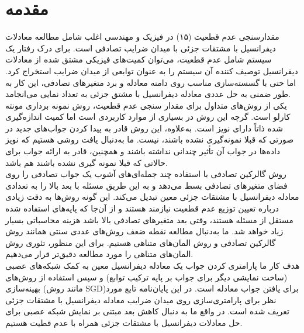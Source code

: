 \section*{مقدمه}
مقدارسنجی عدم قطعیت (۱۵) در فیزیک و مهندسی اغلب شامل مطالعه معادلات دیفرانسیل با مشتقات جزئی با میدان ضرایب تصادفی است. برای درک رفتار یک سیستم شامل عدم قطعیت، می‌توان کمیت‌های فیزیکی مشتق شده از معادلات دیفرانسیل توصیف کننده آن سیستم را به عنوان توابعی از میدان ضرایب استخراج کرد. اما حتی با گسسته‌سازی مناسب روی دامنه معادله و برد متغیرهای تصادفی، این کار به طور ضمنی به حل عددی معادله دیفرانسیل با مشتق جزئی به تعداد نمایی می‌انجامد.\\
یکی از روش‌های متداول برای مقدار سنجی عدم قطعیت، روش نمونه‌ برداری مونته کارلو است. گرچه این روش در بسیاری از موارد کاربردی است اما کمیت اندازه‌گیری شده ذاتاً دارای نویز است. به‌علاوه، این روش قادر به پیدا کردن جواب‌های جدید در صورتی که قبلا نمونه‌گیری نشده باشند، نیست. ما به‌دنبال یافت روشی هستیم که نویز داده‌ها در جواب آن تأثیر چندانی نداشته باشند و همچنین، قادر به ارائه جواب برای حالاتی که قبلا نمونه گیری نشده باشند هم باشد. \\
روش گالرکین تصادفی با استفاده چند جمله‌ای‌های آشوب  یک جواب تصادفی را روی فضای متغیرهای تصادفی بسط می‌دهد و به این طریق مسئله با بعد بالا را به تعدادی معادله دیفرانسیل با مشتقات جزئی معین تبدیل می‌کند. این گونه روش‌ها به دقت زیادی درباره تعیین توزیع عدم قطعیت نیازمند هستند و از آن‌جا که پایه‌های استفاده شده مستقل از مسئله هستند، وقتی بعد متغیرهای تصادفی بالا باشد هزینه محاسباتی بسیار زیاد خواهد شد. ما به‌دنبال مطالعه نقطه ضعف روش‌های عددی سنتی همانند روش گالرکین تصادفی و روش المان‌های متناهی هستیم. برای این منظور، تئوری روش المان‌های متناهی را مورد مطالعه دقیق‌تر قرار می‌دهیم.\\
هدف کار ما پارامتری کردن جواب یک معادله دیفرانسیل معین به کمک شبکه‌های عصبی (ساخت نمایشی دیگر برای جواب بر پایه ترکیب توابع) و سپس استفاده از روش‌های بهینه‌سازی  (مانند روش SGD)برای یافتن جواب معادله است. در این پایان‌نامه تابع مورد نظر برای پارامتری‌سازی روی میدان ضرایب معادله دیفرانسیل با مشتقات جزئی تعریف شده است. در واقع ما به دنبال کاهش بعد مبتنی بر نمایش شبکه ‌عصبی برای حل معادلات دیفرانسیل با مشتقات جزئی همراه با عدم قطیت هستیم.
